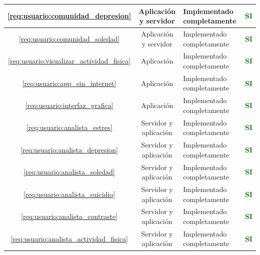 \begin{xltabular}{\textwidth}{|c|c|X|c|}
        \hline
        \ref{req:usuario:comunidad_depresion} & Aplicación y servidor & Implementado completamente & \textcolor{green}{\textbf{SI}} \\
        \hline
        \ref{req:usuario:comunidad_soledad} & Aplicación y servidor & Implementado completamente & \textcolor{green}{\textbf{SI}} \\
        \hline
        \ref{req:usuario:visualizar_actividad_fisica} & Aplicación & Implementado completamente & \textcolor{green}{\textbf{SI}} \\
        \hline
        \ref{req:usuario:app_sin_internet} & Aplicación & Implementado completamente & \textcolor{green}{\textbf{SI}} \\
        \hline
        \ref{req:usuario:interfaz_grafica} & Aplicación & Implementado completamente & \textcolor{green}{\textbf{SI}} \\
        \hline
        \ref{req:usuario:analista_estres} & Servidor y aplicación & Implementado completamente & \textcolor{green}{\textbf{SI}} \\
        \hline
        \ref{req:usuario:analista_depresion} & Servidor y aplicación & Implementado completamente & \textcolor{green}{\textbf{SI}} \\
        \hline
        \ref{req:usuario:analista_soledad} & Servidor y aplicación & Implementado completamente & \textcolor{green}{\textbf{SI}} \\
        \hline
        \ref{req:usuario:analista_suicidio} & Servidor y aplicación & Implementado completamente & \textcolor{green}{\textbf{SI}} \\
        \hline
        \ref{req:usuario:analista_contraste} & Servidor y aplicación & Implementado completamente & \textcolor{green}{\textbf{SI}} \\
        \hline
        \ref{req:usuario:analista_actividad_fisica} & Servidor y aplicación & Implementado completamente & \textcolor{green}{\textbf{SI}} \\
    \end{xltabular}


